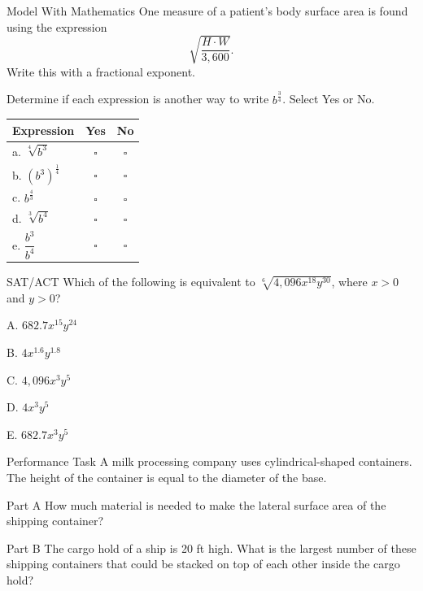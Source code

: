 \documentclass{article}
\newenvironment{practice}[2]{}{}        %
\newcommand{\answer}[1]{}               %
\newcommand{\placeholder}[2]{}          %
\begin{document}
\begin{practice}{47}{2}
Model With Mathematics One measure of a patient's body surface area is found using the expression
\[
\sqrt{\frac{H\cdot W}{3,600}}.
\]
Write this with a fractional exponent.

\answer{\(\left(\frac{HW}{3,600}\right)^{\frac12}\)}
\end{practice}

\begin{practice}{48}{1}
Determine if each expression is another way to write \(b^{\frac34}\). Select Yes or No.

\begin{tabular}{lcc}
\toprule
Expression & Yes & No \\
\midrule
a. \(\sqrt[4]{b^3}\) & \(\square\) & \(\square\) \\
b. \((b^3)^{\frac14}\) & \(\square\) & \(\square\) \\
c. \(b^{\frac43}\) & \(\square\) & \(\square\) \\
d. \(\sqrt[3]{b^4}\) & \(\square\) & \(\square\) \\
e. \(\dfrac{b^3}{b^4}\) & \(\square\) & \(\square\) \\
\bottomrule
\end{tabular}

\answer{a. Yes; b. Yes; c. No; d. No; e. No.}
\end{practice}

\begin{practice}{49}{1}
SAT/ACT Which of the following is equivalent to \(\sqrt[6]{4,096x^{18}y^{30}}\), where \(x>0\) and \(y>0\)?

A. \(682.7x^{15}y^{24}\)

B. \(4x^{1.6}y^{1.8}\)

C. \(4,096x^3y^5\)

D. \(4x^3y^5\)

E. \(682.7x^3y^5\)

\answer{D. \(4x^3y^5\)}
\end{practice}

\begin{practice}{50}{3}
Performance Task A milk processing company uses cylindrical-shaped containers. The height of the container is equal to the diameter of the base.

\placeholder{illustration}{Milk processing machine with an orange cylindrical container; label reads "volume 169.65 ft^3."}

Part A How much material is needed to make the lateral surface area of the shipping container?

Part B The cargo hold of a ship is 20 ft high. What is the largest number of these shipping containers that could be stacked on top of each other inside the cargo hold?

\answer{Part A \(36\pi\text{ ft}^2\). Part B 3 containers.}
\end{practice}
\end{document}
